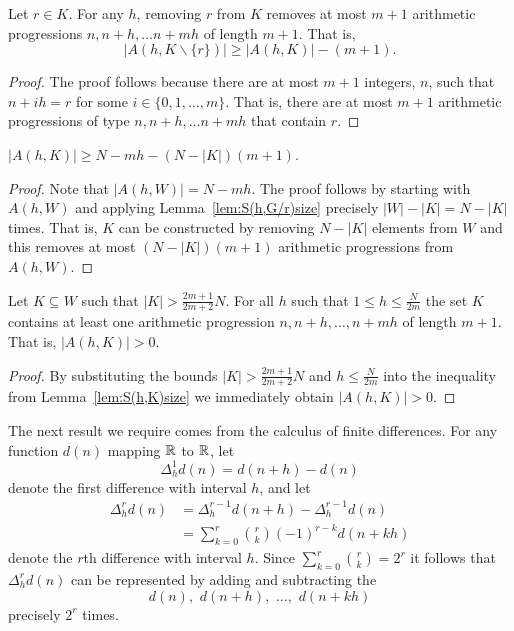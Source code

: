 \documentclass[journal]{IEEEtran}
\begin{document}
\begin{lemma} \label{lem:S(h,G/r)size}
Let $r \in K$.  For any $h$, removing $r$ from $K$ removes at most $m+1$ arithmetic progressions $n, n+h, \dots n+mh$ of length $m+1$.  That is,
\[
|A(h,K \backslash \{r\})| \geq |A(h,K)| - (m+1).
\]
\end{lemma}
\begin{proof}
The proof follows because there are at most $m+1$ integers, $n$, such that $n+ih = r$ for some $i \in \{0,1,\dots,m\}$.  That is, there are at most $m+1$ arithmetic progressions of type $n, n+h, \dots n+mh$ that contain $r$.
\end{proof}

 \begin{lemma} \label{lem:S(h,K)size}
 $|A(h,K)| \geq N - mh - (N - |K|)(m+1)$.
 \end{lemma}
 \begin{proof}
 Note that $|A(h,W)| = N - mh$.  The proof follows by starting with $A(h,W)$ and applying Lemma~\ref{lem:S(h,G/r)size} precisely $|W|-|K|=N-|K|$ times. That is, $K$ can be constructed by removing $N - |K|$ elements from $W$ and this removes at most $(N - |K|)(m+1)$ arithmetic progressions from $A(h,W)$.
 \end{proof}
 
 \begin{corollary} \label{cor:S(h,K)>0}
 Let $K \subseteq W$ such that $|K| > \frac{2m+1}{2m+2}N$. For all $h$ such that $1\leq h \leq\frac{N}{2m}$ the set $K$ contains at least one arithmetic progression $n, n+h, \dots, n+mh$ of length $m+1$. That is, $|A(h,K)| > 0$.
 \end{corollary}
 \begin{proof}
 By substituting the bounds $|K| > \frac{2m+1}{2m+2}N$ and $h \leq\frac{N}{2m}$ into the inequality from Lemma~\ref{lem:S(h,K)size} we immediately obtain $|A(h,K)| > 0$.
 \end{proof}

The next result we require comes from the calculus of finite differences. For any function $d(n)$ mapping ${\mathbb R}$ to ${\mathbb R}$, let 
\[
\Delta_h^1 d(n) = d(n+h) - d(n)
\] 
denote the first difference with interval $h$, and let
\begin{equation}\label{eq:mthdiffformula}
\begin{split}
\Delta_h^r d(n) &= \Delta_h^{r-1} d(n+h) - \Delta_h^{r-1} d(n) \\
&= \sum_{k=0}^{r}\binom{r}{k}(-1)^{r-k}d(n+kh)
\end{split}
\end{equation}
denote the $r$th difference with interval $h$. Since $\sum_{k=0}^{r}\binom{r}{k} = 2^r$ it follows that $\Delta_h^r d(n)$ can be represented by adding and subtracting the 
\[
d(n), \,\, d(n+h), \,\, \dots, \,\, d(n+kh)
\] 
precisely $2^r$ times.
\end{document}
